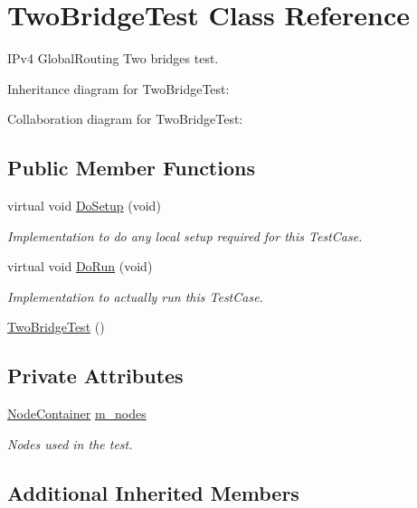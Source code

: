 \hypertarget{classTwoBridgeTest}{}\section{Two\+Bridge\+Test Class Reference}
\label{classTwoBridgeTest}


I\+Pv4 Global\+Routing Two bridges test.  




Inheritance diagram for Two\+Bridge\+Test\+:


Collaboration diagram for Two\+Bridge\+Test\+:
\subsection*{Public Member Functions}
\begin{DoxyCompactItemize}
\item 
virtual void \hyperlink{classTwoBridgeTest_aeff92a896b2e27f3eba2dcefd50b5f69}{Do\+Setup} (void)
\begin{DoxyCompactList}\small\item\em Implementation to do any local setup required for this Test\+Case. \end{DoxyCompactList}\item 
virtual void \hyperlink{classTwoBridgeTest_aec19ba40f62db2a15f36a0d8d9004095}{Do\+Run} (void)
\begin{DoxyCompactList}\small\item\em Implementation to actually run this Test\+Case. \end{DoxyCompactList}\item 
\hyperlink{classTwoBridgeTest_af9cf5c75c7f2ea1f91bb706b25aeaea5}{Two\+Bridge\+Test} ()
\end{DoxyCompactItemize}
\subsection*{Private Attributes}
\begin{DoxyCompactItemize}
\item 
\hyperlink{classns3_1_1NodeContainer}{Node\+Container} \hyperlink{classTwoBridgeTest_af72518a9099a0db24ee51af9bc783c01}{m\+\_\+nodes}
\begin{DoxyCompactList}\small\item\em Nodes used in the test. \end{DoxyCompactList}\end{DoxyCompactItemize}
\subsection*{Additional Inherited Members}


